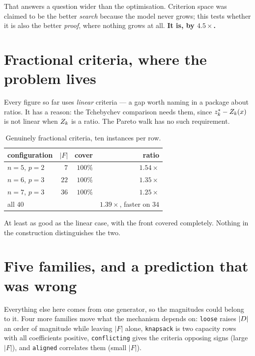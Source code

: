 \documentclass[11pt,a4paper]{article}
\begin{document}
That answers a question wider than the optimisation.  Criterion space was
claimed to be the better \emph{search} because the model never grows; this
tests whether it is also the better \emph{proof}, where nothing grows at all.
\textbf{It is, by $4.5\times$.}

\section{Fractional criteria, where the problem lives}

Every figure so far uses \emph{linear} criteria --- a gap worth naming in a
package about ratios.  It has a reason: the Tchebychev comparison needs them,
since $z^{*}_k - Z_k(x)$ is not linear when $Z_k$ is a ratio.  The Pareto
walk has no such requirement.

\begin{table}[h]
\centering
\caption{Genuinely fractional criteria, ten instances per row.}
\begin{tabular}{lrrr}
\toprule
configuration & $|F|$ & cover & ratio \\
\midrule
$n=5$, $p=2$ & $7$  & $100\%$ & $1.54\times$ \\
$n=6$, $p=3$ & $22$ & $100\%$ & $1.35\times$ \\
$n=7$, $p=3$ & $36$ & $100\%$ & $1.25\times$ \\
\midrule
all $40$ & & & $\mathbf{1.39\times}$, faster on $34$ \\
\bottomrule
\end{tabular}
\end{table}

\noindent
At least as good as the linear case, with the front covered completely.
Nothing in the construction distinguishes the two.

\section{Five families, and a prediction that was wrong}

Everything else here comes from one generator, so the magnitudes could belong
to it.  Four more families move what the mechanism depends on: \texttt{loose}
raises $|D|$ an order of magnitude while leaving $|F|$ alone,
\texttt{knapsack} is two capacity rows with all coefficients positive,
\texttt{conflicting} gives the criteria opposing signs (large $|F|$), and
\texttt{aligned} correlates them (small $|F|$).
\end{document}
